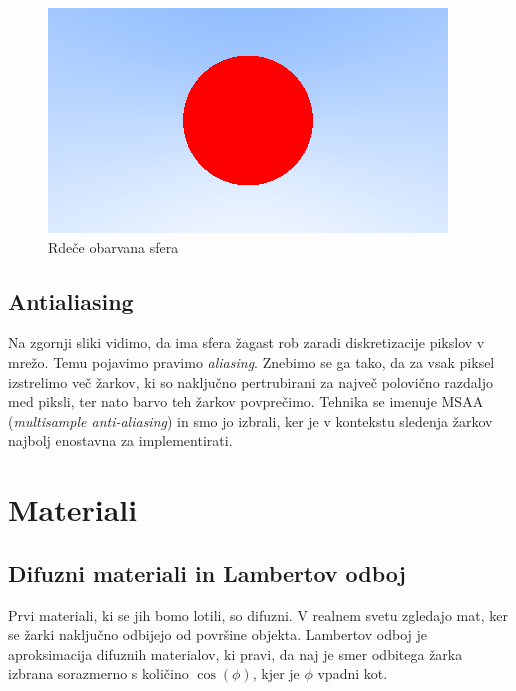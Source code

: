\documentclass[12pt, a4paper]{article}
\begin{document}
\begin{figure}[H]
	\label{fig:red_sphere}
	\includegraphics[width=\textwidth]{red_sphere}
	\caption{Rdeče obarvana sfera}
\end{figure}

\subsection{Antialiasing}

Na zgornji sliki vidimo, da ima sfera žagast rob zaradi diskretizacije pikslov v mrežo. Temu
pojavimo pravimo \textit{aliasing}. Znebimo se ga tako, da za vsak piksel izstrelimo več žarkov, ki so naključno
pertrubirani za največ polovično razdaljo med piksli, ter nato barvo teh žarkov povprečimo. Tehnika se imenuje
MSAA (\textit{multisample anti-aliasing}) in smo jo izbrali, ker je v kontekstu sledenja žarkov najbolj
enostavna za implementirati.

\section{Materiali}

\subsection{Difuzni materiali in Lambertov odboj}

Prvi materiali, ki se jih bomo lotili, so difuzni. V realnem svetu zgledajo mat, ker se žarki naključno odbijejo od
površine objekta. Lambertov odboj je aproksimacija difuznih materialov, ki pravi, da naj je smer odbitega žarka
izbrana sorazmerno s količino $\cos (\phi) $, kjer je $\phi$ vpadni kot.
\end{document}
